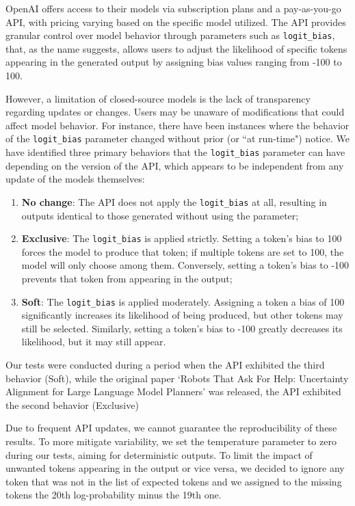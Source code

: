 OpenAI offers access to their models via subscription plans and a pay-as-you-go API,
with pricing varying based on the specific model utilized. The API provides granular
control over model behavior through parameters such as \texttt{logit\_bias}, that,
as the name suggests, allows users to adjust the likelihood of specific tokens appearing
in the generated output by assigning bias values ranging from -100 to 100.

However, a limitation of closed-source models is the lack of transparency
regarding updates or changes. Users may be unaware of modifications that could affect
model behavior. For instance, there have been instances where the behavior of the
\texttt{logit\_bias} parameter changed without prior (or ``at run-time") notice.
We have identified three primary behaviors that the \texttt{logit\_bias} parameter
can have depending on the version of the API, which appears to be independent
from any update of the models themselves:
\begin{enumerate}
  \item \textbf{No change}: The API does not apply the \texttt{logit\_bias} at
    all, resulting in outputs identical to those generated without using the parameter;

  \item \textbf{Exclusive}: The \texttt{logit\_bias} is applied strictly. Setting
    a token's bias to 100 forces the model to produce that token; if multiple
    tokens are set to 100, the model will only choose among them. Conversely, setting
    a token's bias to -100 prevents that token from appearing in the output;

  \item \textbf{Soft}: The \texttt{logit\_bias} is applied moderately. Assigning
    a token a bias of 100 significantly increases its likelihood of being produced,
    but other tokens may still be selected. Similarly, setting a token's bias to
    -100 greatly decreases its likelihood, but it may still appear.
\end{enumerate}

Our tests were conducted during a period when the API exhibited the third
behavior (Soft), while the original paper `Robots That Ask For Help: Uncertainty
Alignment for Large Language Model Planners' was released, the API exhibited the
second behavior (Exclusive)

Due to frequent API updates, we cannot guarantee the reproducibility of these results.
To more mitigate variability, we set the temperature parameter to zero during our
tests, aiming for deterministic outputs. To limit the impact of unwanted tokens appearing
in the output or vice versa, we decided to ignore any token that was not in the
list of expected tokens and we assigned to the missing tokens the 20th log-probability
minus the 19th one.

